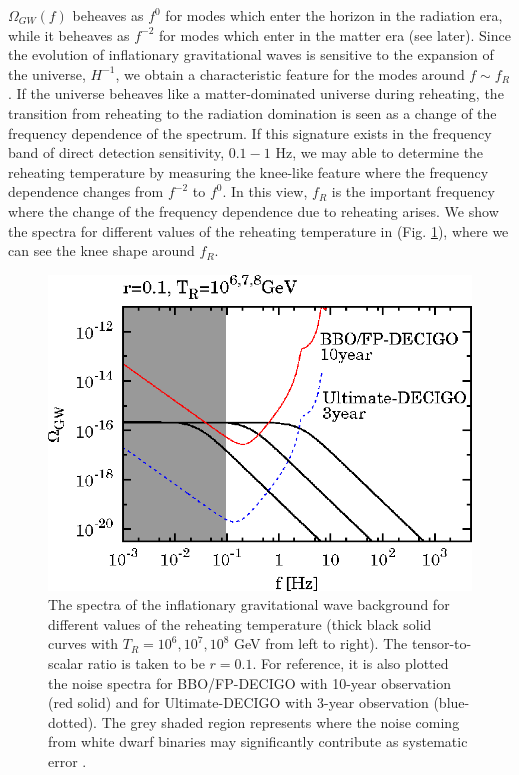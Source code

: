 \documentclass[11pt,a4paper,twoside]{book}
\begin{document}
$\Omega_{GW}(f)$ beheaves  as $ f^{0} $ for modes which enter the horizon in the radiation era, while it beheaves as $ f^{-2} $ for  modes which enter in the matter era (see later). Since the evolution of inflationary gravitational waves is sensitive to the expansion of the universe, $ H^{-1} $, we obtain a characteristic feature for the modes around $ f \sim f_{R} $. If the universe beheaves like a matter-dominated universe during reheating, the transition from reheating to the radiation domination is seen as a change of the frequency dependence of the spectrum. If this signature exists in the frequency band of direct detection sensitivity, $ 0.1-1 $ Hz, we may able to determine the reheating temperature by measuring the knee-like feature where the frequency dependence changes from $ f^{-2} $ to $ f^{0} $. In this view, $ f_{R} $ is the important frequency where the change of the frequency dependence due to reheating arises. We show the spectra for different values of the reheating temperature in (Fig. \ref{fig:kurojanaginakayamafig1}), where we can see the knee shape around $ f_{R} $.\\
\begin{figure}
	\centering
	\includegraphics[width=0.7\linewidth, height=0.3\textheight]{Images/Chap3/Kurojanagi_Nakayama_Fig1}
	\caption{The spectra of the inflationary gravitational wave background for different values of the reheating temperature (thick black solid curves with $ T_{R}=10^{6},10^{7},10^{8} $ GeV from left to right). The tensor-to-scalar ratio is taken to be $ r=0.1 $. For reference, it is also plotted the noise spectra for BBO/FP-DECIGO with 10-year observation (red solid) and for Ultimate-DECIGO with 3-year observation (blue-dotted).  The grey  shaded region represents where the noise coming from white dwarf binaries may significantly contribute as systematic error \cite{Chap3:ProspectsForDeterminationWithDetectors}.}
	\label{fig:kurojanaginakayamafig1}
\end{figure}
\end{document}
